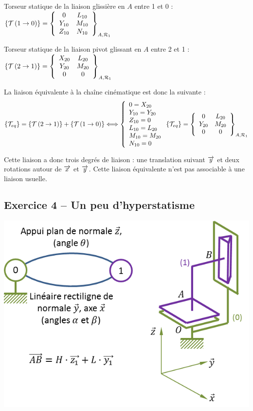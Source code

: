 \documentclass[10pt]{article}
\begin{document}
{\begin{corrige}
\noindent\colorbox{grisf}{}

Torseur statique de la liaison glissière en $A$ entre 1 et 0 : 
$\torseurstat{T}{1}{0}=\torseurcol{0}{Y_{10}}{Z_{10}}{L_{10}}{M_{10}}{N_{10}}{A,\mathcal{R}_1}$

Torseur statique de la liaison pivot glissant en $A$ entre 2 et 1 :
$\torseurstat{T}{2}{1}=\torseurcol{X_{20}}{Y_{20}}{0}{L_{20}}{M_{20}}{0}{A,\mathcal{R}_1}
$

La liaison équivalente à la chaîne cinématique est donc la suivante : 
$$
\{\mathcal{T}_{eq}\}=\torseurstat{T}{2}{1}+\torseurstat{T}{1}{0}
\Longleftrightarrow
\left\{
\begin{array}{l}
0=X_{20}\\
Y_{10}=Y_{20}\\
Z_{10}=0\\
L_{10}=L_{20}\\
M_{10}=M_{20}\\
N_{10}=0
\end{array}
\right.
\{\mathcal{T}_{eq}\}=
\torseurcol{0}{Y_{20}}{0}{L_{20}}{M_{20}}{0}{A,\mathcal{R}_1}
$$

Cette liaison a donc trois degrés de liaison : une translation suivant $\vect{y}$ et deux rotations autour de $\vect{x}$ et $\vect{y}$. Cette liaison équivalente n'est pas associable à une liaison usuelle. 

\end{corrige}
}{}

\subsection*{Exercice 4 -- Un peu d'hyperstatisme}

\begin{center}
\includegraphics[width=.6\textwidth]{images/chs1}
\end{center}
\end{document}
